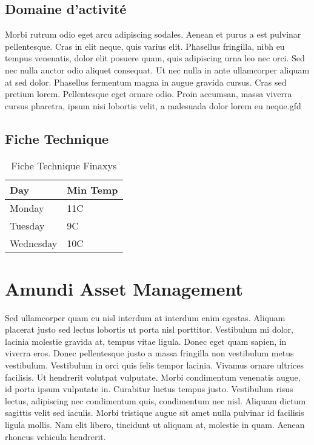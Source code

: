 
\subsection{Domaine d'activité}
Morbi rutrum odio eget arcu adipiscing sodales. Aenean et purus a est pulvinar pellentesque. Cras in elit neque, quis varius elit. Phasellus fringilla, nibh eu tempus venenatis, dolor elit posuere quam, quis adipiscing urna leo nec orci. Sed nec nulla auctor odio aliquet consequat. Ut nec nulla in ante ullamcorper aliquam at sed dolor. Phasellus fermentum magna in augue gravida cursus. Cras sed pretium lorem. Pellentesque eget ornare odio. Proin accumsan, massa viverra cursus pharetra, ipsum nisi lobortis velit, a malesuada dolor lorem eu neque.gfd

\subsection{Fiche Technique}
\begin{table}[htp]
    \begin{center}
        \begin{tabular}{ | l | l |}
            \hline
            Day & Min Temp  \\ \hline
            Monday & 11C \\ \hline
            Tuesday & 9C  \\ \hline
            Wednesday & 10C  \\
            \hline
            \end{tabular}
            \caption{Fiche Technique Finaxys}
    \end{center}
\end{table}


\section{Amundi Asset Management}

Sed ullamcorper quam eu nisl interdum at interdum enim egestas. Aliquam placerat justo sed lectus lobortis ut porta nisl porttitor. Vestibulum mi dolor, lacinia molestie gravida at, tempus vitae ligula. Donec eget quam sapien, in viverra eros. Donec pellentesque justo a massa fringilla non vestibulum metus vestibulum. Vestibulum in orci quis felis tempor lacinia. Vivamus ornare ultrices facilisis. Ut hendrerit volutpat vulputate. Morbi condimentum venenatis augue, id porta ipsum vulputate in. Curabitur luctus tempus justo. Vestibulum risus lectus, adipiscing nec condimentum quis, condimentum nec nisl. Aliquam dictum sagittis velit sed iaculis. Morbi tristique augue sit amet nulla pulvinar id facilisis ligula mollis. Nam elit libero, tincidunt ut aliquam at, molestie in quam. Aenean rhoncus vehicula hendrerit.

